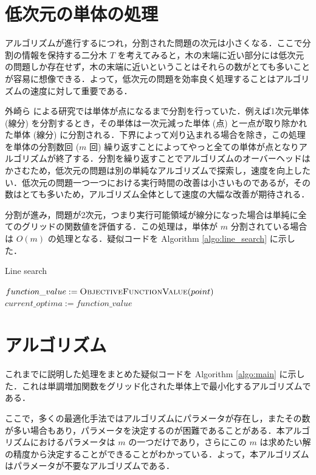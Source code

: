 \documentclass[a4paper,11pt]{jreport}
\begin{document}
\section{低次元の単体の処理}

アルゴリズムが進行するにつれ，分割された問題の次元は小さくなる．ここで分割の情報を保持する二分木 $ T $ を考えてみると，木の末端に近い部分には低次元の問題しか存在せず，木の末端に近いということはそれらの数がとても多いことが容易に想像できる．よって，低次元の問題を効率良く処理することはアルゴリズムの速度に対して重要である．\par
外崎ら \cite{tonosaki} による研究では単体が点になるまで分割を行っていた．例えば1次元単体 (線分) を分割するとき，その単体は一次元減った単体 (点) と一点が取り除かれた単体 (線分) に分割される．下界によって刈り込まれる場合を除き，この処理を単体の分割数回 ($ m $ 回) 繰り返すことによってやっと全ての単体が点となりアルゴリズムが終了する．分割を繰り返すことでアルゴリズムのオーバーヘッドはかさむため，低次元の問題は別の単純なアルゴリズムで探索し，速度を向上したい．低次元の問題一つ一つにおける実行時間の改善は小さいものであるが，その数はとても多いため，アルゴリズム全体として速度の大幅な改善が期待される．\par
分割が進み，問題が2次元，つまり実行可能領域が線分になった場合は単純に全てのグリッドの関数値を評価する．この処理は，単体が $ m $ 分割されている場合は $ O(m) $ の処理となる．疑似コードを Algorithm \ref{algo:line_search} に示した．\par

\begin{algorithm}
\caption{Line search}
\label{algo:line_search}
\begin{algorithmic}[1]
\State $ function\_value := \Call{ObjectiveFunctionValue}{point} $
\State $current\_optima := function\_value $
\EndIf
\EndFor
\EndFunction
\end{algorithmic}
\end{algorithm}

\section{アルゴリズム}

これまでに説明した処理をまとめた疑似コードを Algorithm \ref{algo:main} に示した．これは単調増加関数をグリッド化された単体上で最小化するアルゴリズムである．\par
ここで，多くの最適化手法ではアルゴリズムにパラメータが存在し，またその数が多い場合もあり，パラメータを決定するのが困難であることがある．本アルゴリズムにおけるパラメータは $ m $ の一つだけであり，さらにこの $ m $ は求めたい解の精度から決定することができることがわかっている．よって，本アルゴリズムはパラメータが不要なアルゴリズムである．\par
\end{document}
